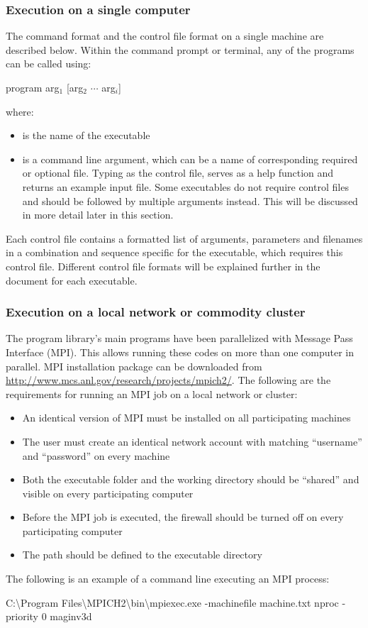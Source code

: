 \subsubsection{Execution on a single computer}
The command format and the control file format on a single machine are described below. Within the command prompt or terminal, any of the programs can be called using:
\begin{fileExample}
program arg$_1$ [arg$_2$ $\cdots$ arg$_i$]
\end{fileExample}
%
where:
\begin{itemize}
\item[\codeName{program}] is the name of the executable
\item[\codeName{arg$_i$}] is a command line argument, which can be a name of corresponding required or optional file. Typing  as the control file, serves as a help function and returns an example input file. Some executables do not require control files and should be followed by multiple arguments instead. This will be discussed in more detail later in this section.
\end{itemize}

Each control file contains a formatted list of arguments, parameters and filenames in a combination and sequence specific for the executable, which requires this control file. Different control file formats will be explained further in the document for each executable.

\subsubsection{Execution on a local network or commodity cluster}

The \prog program library's main programs have been parallelized with Message Pass Interface (MPI). This allows running these codes on more than one computer in parallel. MPI installation package can be downloaded from \url{http://www.mcs.anl.gov/research/projects/mpich2/}. The following are the requirements for running an MPI job on a local network or cluster:
\begin{itemize}
\item An identical version of MPI must be installed on all participating machines
\item The user must create an identical network account with matching ``username'' and ``password'' on every machine
\item Both the executable folder and the working directory should be ``shared'' and visible on every participating computer
\item Before the MPI job is executed, the firewall should be turned off on every participating computer
\item The path should be defined to the executable directory
\end{itemize}
%
The following is an example of a command line executing an MPI process:
\begin{fileExample}	
C:\textbackslash Program Files\textbackslash MPICH2\textbackslash bin\textbackslash mpiexec.exe -machinefile machine.txt nproc -priority 0 maginv3d
\end{fileExample}

